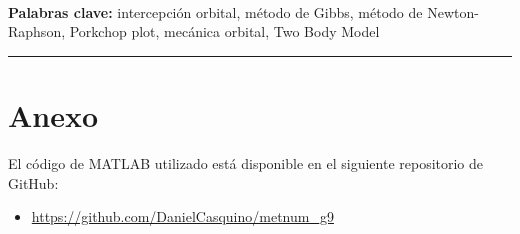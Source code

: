 \documentclass[a4paper,11pt]{article}
\renewenvironment{abstract}
 {\par\noindent\textbf{\abstractname}\ \ignorespaces\\}
 {\par\noindent\medskip}
\begin{document}


\pagestyle{fancy}
\thispagestyle{empty}
\fancyhead[L]{}
\renewcommand*{\thefootnote}{\fnsymbol{footnote}}

\begin{abstract}
    
\end{abstract}

\noindent\textbf{Palabras clave:} intercepción orbital, método de Gibbs, método de Newton-Raphson, Porkchop plot, mecánica orbital, Two Body Model
\vspace{0.5cm}

{\color{gray}\hrule}
\medskip
\begin{multicols}{2}
    \renewcommand{\contentsname}{Índice}
    \tableofcontents
    
    
    
    
    
    
    
    
    
    
\end{multicols}
\newpage
\printbibliography[title={Referencias}]

\appendix
\section*{Anexo}
El código de MATLAB utilizado está disponible en el siguiente repositorio de GitHub:

\begin{itemize}
    \item \url{https://github.com/DanielCasquino/metnum_g9}
\end{itemize}
\end{document}
